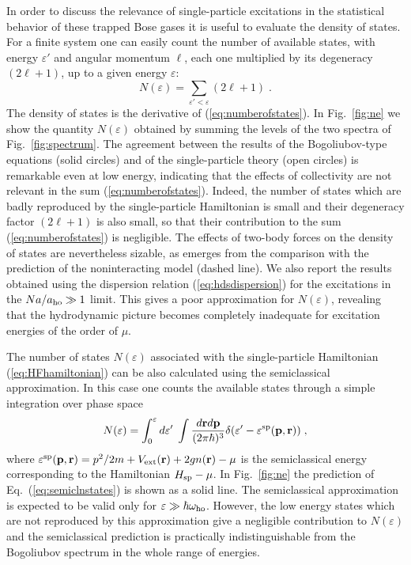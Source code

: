 In order to discuss the relevance of single-particle excitations in 
the statistical behavior of these trapped Bose gases it is useful to
evaluate the density of states.  For a finite system one can easily
count the number of available states, with energy $\varepsilon'$ and
angular momentum $\ell$, each one multiplied by its degeneracy 
$(2\ell +1)$, up to a given energy $\varepsilon$:
\begin{equation}
N (\varepsilon) = \sum_{\varepsilon' < \varepsilon } (2 \ell +1 ) \; .
\label{eq:numberofstates}
\end{equation}
The density of states is the derivative of (\ref{eq:numberofstates}). 
In Fig.~\ref{fig:ne} we show the quantity  $N(\varepsilon)$  obtained
by summing the levels of the two spectra of Fig.~\ref{fig:spectrum}. The
agreement between the results of the Bogoliubov-type equations (solid 
circles) and of the single-particle theory (open circles) is remarkable 
even at low energy, indicating that the effects of collectivity are not 
relevant in  the sum (\ref{eq:numberofstates}). Indeed, the number of states
which are badly reproduced by the single-particle Hamiltonian is small
and their degeneracy factor $(2\ell +1)$ is also small, so that their
contribution to the sum (\ref{eq:numberofstates}) is negligible. 
The effects of two-body forces on the density of states are nevertheless 
sizable, as emerges from the comparison with the prediction of the  
noninteracting model (dashed line).  We also report the results obtained 
using the dispersion relation (\ref{eq:hdsdispersion}) for the excitations
in the $Na/a_{\rm ho}\gg 1$ limit. This gives a poor approximation for 
$N(\varepsilon)$, revealing that the hydrodynamic picture becomes completely 
inadequate for excitation energies of the order of $\mu$.

The number of states $N(\varepsilon)$ associated with the single-particle
Hamiltonian (\ref{eq:HFhamiltonian}) can be also calculated using the
semiclassical approximation. In this case one counts the available states
through a simple integration over phase space
\begin{equation}
N(\varepsilon) = \int_0^\varepsilon d\varepsilon^\prime
\; \int \frac{d{\bf r}d{\bf p}}{(2\pi\hbar)^3} \delta (\varepsilon^\prime
-\varepsilon^{\rm sp}({\bf p},{\bf r})) \;,
\label{eq:semiclnstates}
\end{equation}
where $\varepsilon^{\rm sp}({\bf p},{\bf r})=p^2/2m 
+V_{\rm ext}({\bf r})+2gn({\bf r})
-\mu$ is the semiclassical energy corresponding to the Hamiltonian
$H_{\rm sp}-\mu$. In Fig.~\ref{fig:ne} the prediction of
Eq.~(\ref{eq:semiclnstates}) is shown as a solid line. The semiclassical
approximation is expected to be valid only for
$\varepsilon\gg\hbar\omega_{\rm ho}$.
However, the low energy states which are not reproduced by this
approximation give a negligible contribution to $N(\varepsilon)$ and
the semiclassical prediction is practically
indistinguishable from the Bogoliubov spectrum in the whole range of 
energies. 

